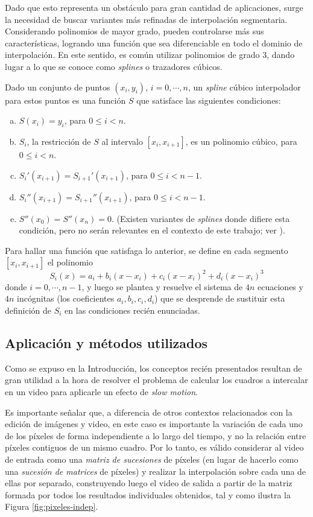     Dado que esto representa un obstáculo para gran cantidad de aplicaciones, surge la necesidad de buscar variantes más refinadas de interpolación segmentaria. Considerando polinomios de mayor grado, pueden controlarse más sus características, logrando una función que sea diferenciable en todo el dominio de interpolación. En este sentido, es común utilizar polinomios de grado 3, dando lugar a lo que se conoce como \emph{splines} o trazadores cúbicos.

    Dado un conjunto de puntos $(x_i, y_i)$, $i = 0, \cdots, n$, un \emph{spline} cúbico interpolador para estos puntos es una función $S$ que satisface las siguientes condiciones:

    \begin{enumerate}[(a)] \setlength{\leftskip}{2em}
      \item $S(x_i) = y_i$, para $0 \leq i < n$.
      \item $S_i$, la restricción de $S$ al intervalo $[x_i, x_{i+1}]$, es un polinomio cúbico, para $0 \leq i < n$.
      \item $S_i'(x_{i+1}) = S_{i+1}'(x_{i+1})$, para $0 \leq i < n - 1$.
      \item $S_i''(x_{i+1}) = S_{i+1}''(x_{i+1})$, para $0 \leq i < n - 1$.
      \item $S''(x_0) = S''(x_n) = 0$. (Existen variantes de \emph{splines} donde difiere esta condición, pero no serán relevantes en el contexto de este trabajo; ver \cite[p. 146]{Burden}).
    \end{enumerate}

    Para hallar una función que satisfaga lo anterior, se define en cada segmento $[x_i, x_{i+1}]$ el polinomio
      \[ S_i(x) = a_i + b_i (x - x_i) + c_i (x - x_i)^2 + d_i (x - x_i)^3 \]
    donde $i = 0, \cdots, n-1$, y luego se plantea y resuelve el sistema de $4n$ ecuaciones y $4n$ incógnitas (los coeficientes $a_i, b_i, c_i, d_i$) que se desprende de sustituir esta definición de $S_i$ en las condiciones recién enunciadas.

  \subsection{Aplicación y métodos utilizados} 
    Como se expuso en la Introducción, los conceptos recién presentados resultan de gran utilidad a la hora de resolver el problema de calcular los cuadros a intercalar en un video para aplicarle un efecto de \emph{slow motion}.

    Es importante señalar que, a diferencia de otros contextos relacionados con la edición de imágenes y video, en este caso es importante la variación de cada uno de los píxeles de forma independiente a lo largo del tiempo,  y no la relación entre píxeles contiguos de un mismo cuadro. Por lo tanto, es válido considerar al video de entrada como una \emph{matriz de sucesiones} de píxeles (en lugar de hacerlo como una \emph{sucesión de matrices} de píxeles) y realizar la interpolación sobre cada una de ellas por separado, construyendo luego el video de salida a partir de la matriz formada por todos los resultados individuales obtenidos, tal y como ilustra la Figura \ref{fig:pixeles-indep}.

